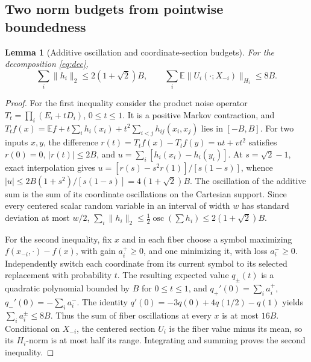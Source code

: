 \documentclass[11pt,letterpaper]{article}
\newtheorem{lemma}[theorem]{Lemma}
\theoremstyle{definition}
\newcommand{\E}{\mathbb E}
\newcommand{\osc}{\operatorname{osc}}
\newcommand{\abs}[1]{\lvert #1\rvert}
\newcommand{\norm}[1]{\lVert #1\rVert}
\begin{document}
\subsection{Two norm budgets from pointwise boundedness}
\begin{lemma}[Additive oscillation and coordinate-section budgets]\label{lem:budgets}
For the decomposition \eqref{eq:dec},
\begin{equation}\label{eq:budgets}
\sum_i\norm{h_i}_2\le 2(1+\sqrt2)B,\qquad
\sum_i\E\norm{U_i(\cdot;X_{-i})}_{H_i}\le8B.
\end{equation}
\end{lemma}
\begin{proof}
For the first inequality consider the product noise operator $T_t=\prod_i(E_i+tD_i)$, $0\le t\le1$. It is a positive Markov contraction, and
$T_t f(x)=\E f+t\sum_i h_i(x_i)+t^2\sum_{i<j}h_{ij}(x_i,x_j)$ lies in $[-B,B]$.
For two inputs $x,y$, the difference $r(t)=T_tf(x)-T_tf(y)=ut+vt^2$ satisfies $r(0)=0$, $\abs{r(t)}\le2B$, and $u=\sum_i[h_i(x_i)-h_i(y_i)]$. At $s=\sqrt2-1$, exact interpolation gives
$u=[r(s)-s^2r(1)]/[s(1-s)]$, whence $\abs u\le2B(1+s^2)/[s(1-s)]=4(1+\sqrt2)B$.
The oscillation of the additive sum is the sum of its coordinate oscillations on the Cartesian support. Since every centered scalar random variable in an interval of width $w$ has standard deviation at most $w/2$, $\sum_i\norm{h_i}_2\le\frac12\osc(\sum h_i)\le2(1+\sqrt2)B$.

For the second inequality, fix $x$ and in each fiber choose a symbol maximizing $f(x_{-i},\cdot)-f(x)$, with gain $a_i^+\ge0$, and one minimizing it, with loss $a_i^-\ge0$. Independently switch each coordinate from its current symbol to its selected replacement with probability $t$. The resulting expected value $q_\pm(t)$ is a quadratic polynomial bounded by $B$ for $0\le t\le1$, and $q_+'(0)=\sum_i a_i^+$, $q_-'(0)=-\sum_i a_i^-$. The identity $q'(0)=-3q(0)+4q(1/2)-q(1)$ yields $\sum_i a_i^\pm\le8B$. Thus the sum of fiber oscillations at every $x$ is at most $16B$. Conditional on $X_{-i}$, the centered section $U_i$ is the fiber value minus its mean, so its $H_i$-norm is at most half its range. Integrating and summing proves the second inequality.
\end{proof}
\end{document}

